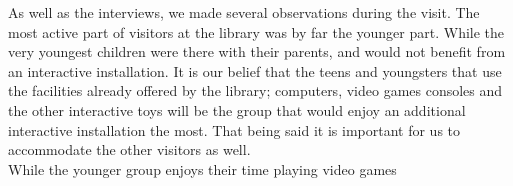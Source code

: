 As well as the interviews, we made several observations during the visit. The most active part of visitors at the library was by far the younger part. While the very youngest children were there with their parents, and would not benefit from an interactive installation. It is our belief that the teens and youngsters that use the facilities already offered by the library; computers, video games consoles and the other interactive toys  will be the group that would enjoy an additional interactive installation the most. That being said it is important for us to accommodate the other visitors as well.
\\
While the younger group enjoys their time playing video games 

